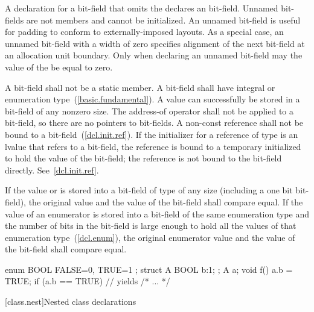 \pnum
{}%
A declaration for a bit-field that omits the 
declares an  bit-field. Unnamed bit-fields are not
members and cannot be initialized.
\enternote
An unnamed bit-field is useful for padding to conform to
externally-imposed layouts.
\exitnote
{}%
%
As a special case, an unnamed bit-field with a width of zero specifies
alignment of the next bit-field at an allocation unit boundary. Only
when declaring an unnamed bit-field may the value of the
 be equal to zero.

\pnum
{}%
A bit-field shall not be a static member. A bit-field shall have
integral or enumeration type~(\ref{basic.fundamental}).
%
A  value can successfully be stored in a bit-field of any
nonzero size.
%
The address-of operator \tcode{\&} shall not be applied to a bit-field,
so there are no pointers to bit-fields.
%
%
%
A non-const reference shall not be bound to a
bit-field~(\ref{dcl.init.ref}).
\enternote
If the initializer for a reference of type   is
an lvalue that refers to a bit-field, the reference is bound to a
temporary initialized to hold the value of the bit-field; the reference
is not bound to the bit-field directly. See~\ref{dcl.init.ref}.
\exitnote

\pnum
If the value  or  is stored into a bit-field of
type  of any size (including a one bit bit-field), the
original  value and the value of the bit-field shall compare
equal. If the value of an enumerator is stored into a bit-field of the
same enumeration type and the number of bits in the bit-field is large
enough to hold all the values of that enumeration type~(\ref{dcl.enum}),
the original enumerator value and the value of the bit-field shall
compare equal.
\enterexample

\begin{codeblock}
enum BOOL { FALSE=0, TRUE=1 };
struct A {
  BOOL b:1;
};
A a;
void f() {
  a.b = TRUE;
  if (a.b == TRUE)              // yields 
    { /* ... */ }
}
\end{codeblock}
\exitexample

[class.nest]{Nested class declarations}%
%
%

